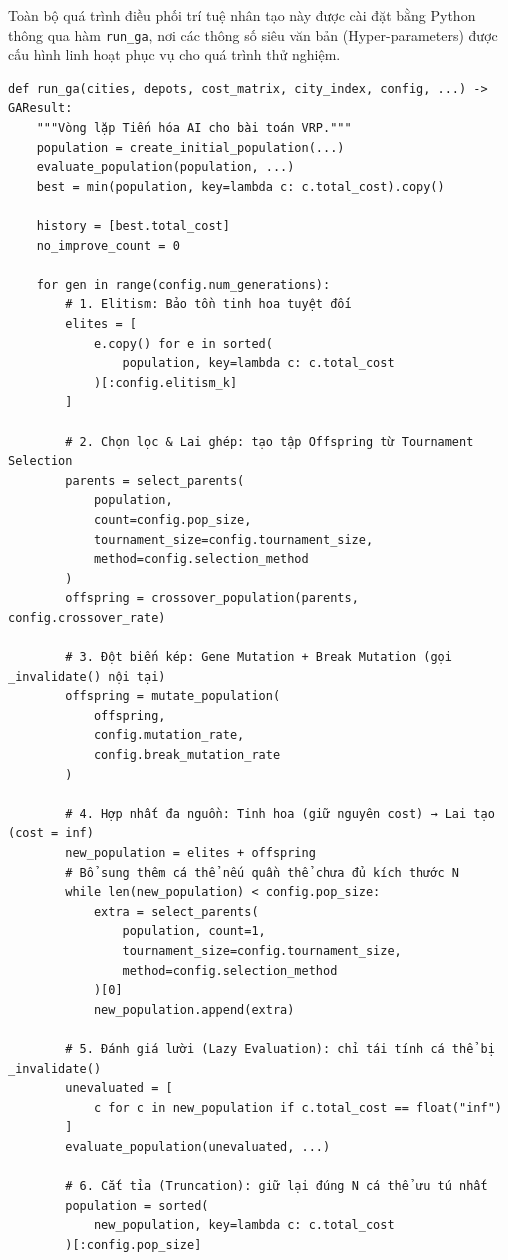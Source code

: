 \documentclass[12pt,a4paper]{article}
\numberwithin{figure}{subsection}
\numberwithin{table}{subsection}
\newcounter{codecounter}
\newenvironment{codeblock}[2]{%
    \refstepcounter{codecounter}%
    \phantomsection%
    \label{#1}%
    \par\smallskip
}{%
    \par\smallskip
}
\begin{document}
Toàn bộ quá trình điều phối trí tuệ nhân tạo này được cài đặt bằng Python thông qua hàm \texttt{run\_ga}, nơi các thông số siêu văn bản (Hyper-parameters) được cấu hình linh hoạt phục vụ cho quá trình thử nghiệm.

\begin{codeblock}{app:code:ga-loop}{Vòng lặp GA trung tâm}
\begin{verbatim}
def run_ga(cities, depots, cost_matrix, city_index, config, ...) -> GAResult:
    """Vòng lặp Tiến hóa AI cho bài toán VRP."""
    population = create_initial_population(...)
    evaluate_population(population, ...)
    best = min(population, key=lambda c: c.total_cost).copy()
    
    history = [best.total_cost]
    no_improve_count = 0

    for gen in range(config.num_generations):
        # 1. Elitism: Bảo tồn tinh hoa tuyệt đối
        elites = [
            e.copy() for e in sorted(
                population, key=lambda c: c.total_cost
            )[:config.elitism_k]
        ]

        # 2. Chọn lọc & Lai ghép: tạo tập Offspring từ Tournament Selection
        parents = select_parents(
            population,
            count=config.pop_size,
            tournament_size=config.tournament_size,
            method=config.selection_method
        )
        offspring = crossover_population(parents, config.crossover_rate)

        # 3. Đột biến kép: Gene Mutation + Break Mutation (gọi _invalidate() nội tại)
        offspring = mutate_population(
            offspring,
            config.mutation_rate,
            config.break_mutation_rate
        )

        # 4. Hợp nhất đa nguồn: Tinh hoa (giữ nguyên cost) → Lai tạo (cost = inf)
        new_population = elites + offspring
        # Bổ sung thêm cá thể nếu quần thể chưa đủ kích thước N
        while len(new_population) < config.pop_size:
            extra = select_parents(
                population, count=1,
                tournament_size=config.tournament_size,
                method=config.selection_method
            )[0]
            new_population.append(extra)

        # 5. Đánh giá lười (Lazy Evaluation): chỉ tái tính cá thể bị _invalidate()
        unevaluated = [
            c for c in new_population if c.total_cost == float("inf")
        ]
        evaluate_population(unevaluated, ...)

        # 6. Cắt tỉa (Truncation): giữ lại đúng N cá thể ưu tú nhất
        population = sorted(
            new_population, key=lambda c: c.total_cost
        )[:config.pop_size]


\end{verbatim}
\end{codeblock}
\end{document}

